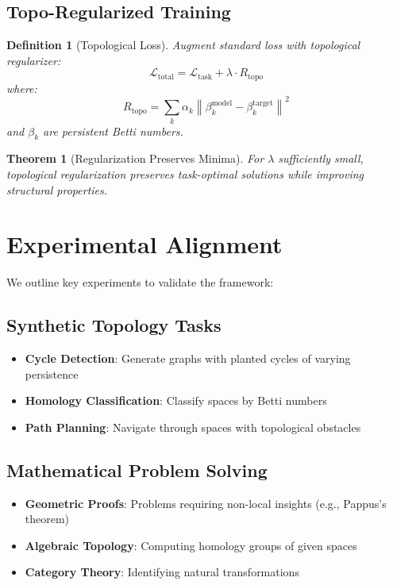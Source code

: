 \documentclass[11pt]{article}
\newtheorem{definition}{Definition}[section]
\newtheorem{theorem}{Theorem}[section]
\begin{document}
\subsection{Topo-Regularized Training}

\begin{definition}[Topological Loss]
Augment standard loss with topological regularizer:
$$\mathcal{L}_{\text{total}} = \mathcal{L}_{\text{task}} + \lambda \cdot R_{\text{topo}}$$
where:
$$R_{\text{topo}} = \sum_k \alpha_k \left\| \beta_k^{\text{model}} - \beta_k^{\text{target}} \right\|^2$$
and $\beta_k$ are persistent Betti numbers.
\end{definition}

\begin{theorem}[Regularization Preserves Minima]
For $\lambda$ sufficiently small, topological regularization preserves task-optimal solutions while improving structural properties.
\end{theorem}

\section{Experimental Alignment}

We outline key experiments to validate the framework:

\subsection{Synthetic Topology Tasks}

\begin{itemize}
    \item \textbf{Cycle Detection}: Generate graphs with planted cycles of varying persistence
    \item \textbf{Homology Classification}: Classify spaces by Betti numbers
    \item \textbf{Path Planning}: Navigate through spaces with topological obstacles
\end{itemize}

\subsection{Mathematical Problem Solving}

\begin{itemize}
    \item \textbf{Geometric Proofs}: Problems requiring non-local insights (e.g., Pappus's theorem)
    \item \textbf{Algebraic Topology}: Computing homology groups of given spaces
    \item \textbf{Category Theory}: Identifying natural transformations
\end{itemize}
\end{document}
